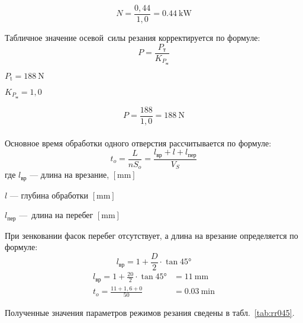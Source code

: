 \documentclass[14pt,russian,a4paper]{extreport}
\begin{document}
$$ N = \frac{0,44}{1,0} = \SI{0,44}{\kilo\watt} $$

Табличное значение осевой силы резания корректируется по формуле:
$$ P = \frac{P_\text{т}}{K_{P_\text{м}}} $$

$ P_\text{t} = \SI{188}{\newton} $ \cite[карта 46]{guzeev:rr} \par
$ K_{P_\text{м}} = 1,0 $ \cite[карта 53]{guzeev:rr}

$$ P = \frac{188}{1,0} = \SI{188}{\newton} $$ \\

Основное время обработки одного отверстия рассчитывается по формуле:
\begin{equation*}
  t_o = \frac{L}{n S_o} = \frac{l_\text{вр} + l + l_\text{пер}}{V_S}
\end{equation*}
где $l_\text{вр}$ --- длина на врезание, $[\si{\milli\meter}]$ \par
$l$ --- глубина обработки $[\si{\milli\meter}]$ \par
$l_\text{пер}$ --- длина на перебег $[\si{\milli\meter}]$

При зенковании фасок перебег отсутствует, а длина на врезание определяется по формуле:
\begin{equation*}
  l_\text{вр} = 1 + \frac{D}{2} \cdot \tan{\ang{45}}
\end{equation*}
\begin{align*}
    l_\text{вр} = 1 + \frac{20}{2} \cdot \tan{\ang{45}} &= \SI{11}{\milli\meter} \\
    t_o = \frac{11 + 1,6 + 0}{50} &= \SI{0,03}{\minute}
\end{align*}

Полученные значения параметров режимов резания сведены в табл.~\ref{tab:rr045}.
\end{document}
